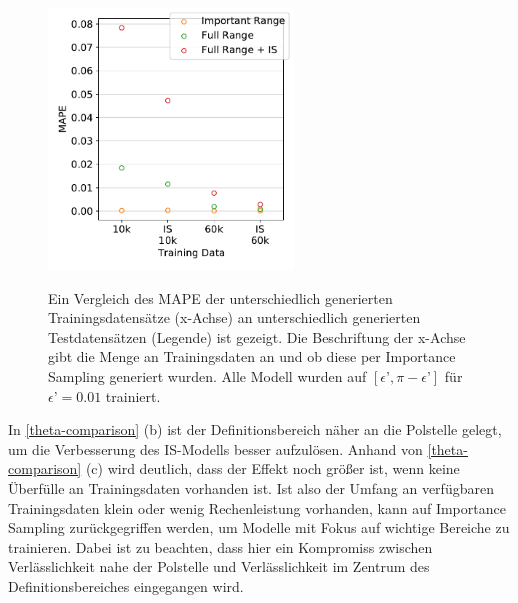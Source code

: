 \begin{figure}
	\centering
	\captionsetup{
		format=plain,
		margin=0.5em,
		labelsep=newline,
		justification=justified,
		singlelinecheck=false
	}
	{\caption{Ein Vergleich des MAPE der unterschiedlich generierten Trainingsdatensätze (x-Achse) an unterschiedlich generierten Testdatensätzen (Legende) ist gezeigt. Die Beschriftung der x-Achse gibt die Menge an Trainingsdaten an und ob diese per Importance Sampling generiert wurden. Alle Modell wurden auf ${[\epsilon’, \pi - \epsilon’]}$ für $\epsilon’=0.01$ trainiert.}\label{MAPE-comp-theta-modelle}}
	{\includegraphics[width=6.5cm]{graphics/26}}
\end{figure}
In \textsf{\autoref{theta-comparison} (b)}  ist der Definitionsbereich näher an die Polstelle gelegt, um die Verbesserung des IS-Modells besser aufzulösen. Anhand von \textsf{\autoref{theta-comparison} (c)}  wird deutlich, dass der Effekt noch größer ist, wenn keine Überfülle an Trainingsdaten vorhanden ist. Ist also der Umfang an verfügbaren Trainingsdaten klein oder wenig Rechenleistung vorhanden, kann auf Importance Sampling zurückgegriffen werden, um Modelle mit Fokus auf wichtige Bereiche zu trainieren. Dabei ist zu beachten, dass hier ein Kompromiss zwischen Verlässlichkeit nahe der Polstelle und Verlässlichkeit im Zentrum des Definitionsbereiches eingegangen wird.


